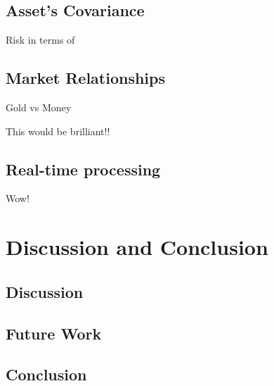 \documentclass{pdfmx4020}
\begin{document}
  \section{Asset's Covariance} %
  \label{sec:covariance}
    Risk in terms of 

  \section{Market Relationships} %
  \label{sec:market_relationships}
    Gold vs Money



    This would be brilliant!!

  \section{Real-time processing} %
  \label{sec:real_time_processing}
    Wow!


\chapter{Discussion and Conclusion}

  \section{Discussion} %
  \label{sec:discussion}
  

  \section{Future Work} %
  \label{sec:future_work}
  

  \section{Conclusion} %
  \label{sec:conclusion}
  






\end{document}
